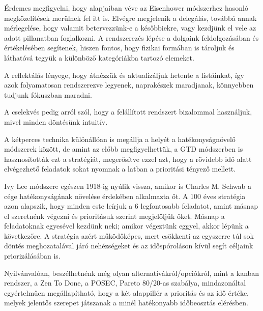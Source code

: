 Érdemes megfigyelni, hogy alapjaiban véve az Eisenhower módszerhez hasonló megközelítések merülnek fel itt is. Elvégre megjelenik a delegálás, továbbá annak mérlegelése, hogy valamit betervezzünk-e a későbbiekre, vagy kezdjünk el vele az adott pillanatban foglalkozni.
A rendszerezés lépése a dolgaink feldolgozásában és értékelésében segítenek, hiszen fontos, hogy fizikai formában is tároljuk és láthatóvá tegyük a különböző kategóriákba tartozó elemeket.

A reflektálás lényege, hogy átnézzük és aktualizáljuk hetente a listáinkat, így azok folyamatosan rendszerezve legyenek, naprakészek maradjanak, könnyebben tudjunk fókuszban maradni.

A cselekvés pedig arról szól, hogy a felállított rendszert bizalommal használjuk, mivel minden döntésünk intuitív.



A kétperces technika különállóan is megállja a helyét a hatékonyságnövelő módszerek között, de amint az előbb megfigyelhettük, a GTD módszerben is hasznosították ezt a stratégiát, megerősítve ezzel azt, hogy a rövidebb idő alatt elvégezhető feladatok sokat nyomnak a latban a prioritási tényező mellett.


Ivy Lee módszere egészen 1918-ig nyúlik vissza, amikor is Charles M. Schwab a cége hatékonyságának növelése érdekében alkalmazta őt. A 100 éves stratégia azon alapszik, hogy minden este leírjuk a 6 legfontosabb feladatot, amint másnap el szeretnénk végezni és prioritásuk szerint megjelöljük őket. Másnap a feladatoknak egyesével kezdünk neki; amikor végeztünk eggyel, akkor lépünk a következőre. A stratégia azért működőképes, mert csökkenti az egyszerre túl sok döntés meghozatalával járó nehézségeket és az időspóroláson kívül segít céljaink priorizálásában is.


Nyilvánvalóan, beszélhetnénk még olyan alternatívákról/opciókról, mint a kanban rendszer, a Zen To Done, a POSEC, Pareto 80/20-as szabálya, mindazonáltal egyértelműen megállapítható, hogy a két alappillér a prioritás és az idő értéke, melyek jelentős szerepet játszanak a minél hatékonyabb időbeosztás elérésben.

